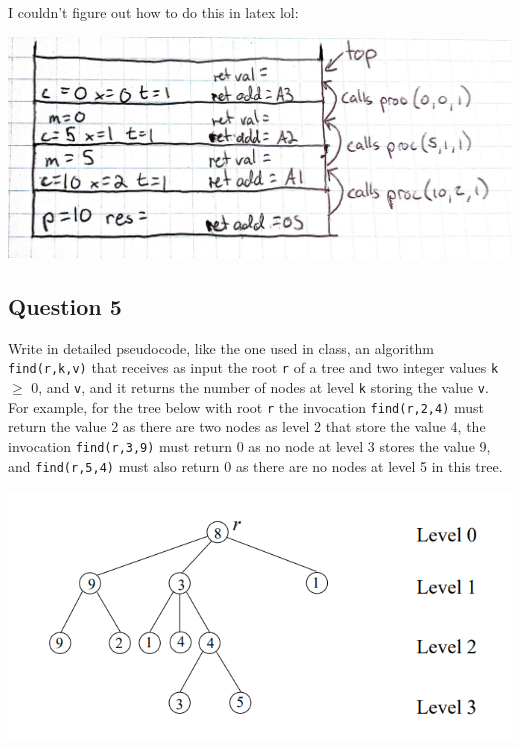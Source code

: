 \documentclass[12pt]{article}
\begin{document}
    I couldn't figure out how to do this in latex lol:

    \begin{center}
        \includegraphics[scale=0.18]{execution stack.jpg}
    \end{center}

\pagebreak
\subsection*{Question 5}
Write in detailed pseudocode, like the one used in class, an algorithm \texttt{find(r,k,v)} that
receives as input the root \texttt{r} of a tree and two integer values \texttt{k} $\geq$ 0, and \texttt{v}, and it returns the number
of nodes at level \texttt{k} storing the value \texttt{v}. For example, for the tree below with root \texttt{r} the invocation
\texttt{find(r,2,4)} must return the value 2 as there are two nodes as level 2 that store the value 4, the
invocation \texttt{find(r,3,9)} must return 0 as no node at level 3 stores the value 9, and \texttt{find(r,5,4)}
must also return 0 as there are no nodes at level 5 in this tree.

\begin{center}
    \includegraphics[scale=0.8]{binarytree.PNG}
\end{center}
\end{document}
